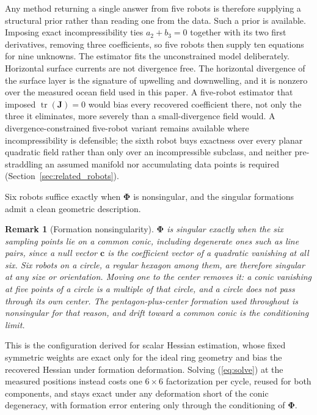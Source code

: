 \documentclass[lettersize,journal]{IEEEtran}
\newtheorem{remark}{Remark}
\begin{document}
Any method returning a single answer from five robots is therefore
supplying a structural prior rather than reading one from the data. Such
a prior is available. Imposing exact incompressibility ties $a_2 + b_3 =
0$ together with its two first derivatives, removing three coefficients,
so five robots then supply ten equations for nine unknowns. The
estimator fits the unconstrained model deliberately. Horizontal surface currents are not
divergence free. The horizontal divergence of the surface layer is the
signature of upwelling and downwelling, and it is nonzero over the
measured ocean field used in this paper. A five-robot estimator
that imposed $\operatorname{tr}(\mathbf{J}) = 0$ would bias every
recovered coefficient there, not only the three it eliminates, more
severely than a small-divergence field would. A divergence-constrained
five-robot variant remains available where incompressibility is
defensible; the sixth
robot buys exactness over every planar quadratic field rather than only
over an incompressible subclass, and neither pre-straddling an assumed
manifold nor accumulating data points is required
(Section~\ref{sec:related_robots}).

Six robots suffice exactly when $\boldsymbol{\Phi}$ is nonsingular, and
the singular formations admit a clean geometric description.

\begin{remark}[Formation nonsingularity]
\label{rem:conic}
$\boldsymbol{\Phi}$ is singular exactly when the six sampling points lie
on a common conic, including degenerate ones such as line pairs, since a
null vector $\mathbf{c}$ is the coefficient vector of a quadratic
vanishing at all six. Six robots on a circle, a regular hexagon among
them, are therefore singular at any size or orientation. Moving one to
the center removes it: a conic vanishing at five points of a circle is a
multiple of that circle, and a circle does not pass through its own
center. The pentagon-plus-center formation used throughout is
nonsingular for that reason, and drift toward a common conic is the
conditioning limit.
\end{remark}

This is the configuration \cite{6} derived for scalar Hessian
estimation, whose
fixed symmetric weights are exact only for the ideal ring geometry and
bias the recovered Hessian under formation deformation. Solving
(\ref{eq:solve}) at the measured positions instead costs one
$6 \times 6$ factorization per cycle, reused for
both components, and stays exact under any deformation short of the
conic degeneracy, with formation error entering only through the
conditioning of $\boldsymbol{\Phi}$.
\end{document}
